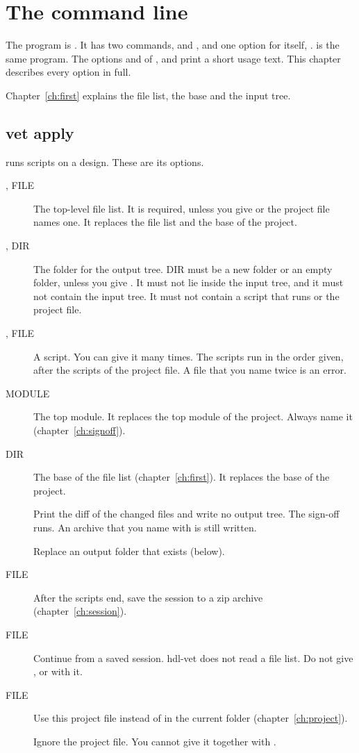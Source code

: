 \chapter{The command line}
\label{ch:cli}

The program is . It has two commands,  and , and
one option for itself, .  is the same program.
The options  and  of ,  and 
print a short usage text. This chapter describes every option in full.

Chapter~\ref{ch:first} explains the file list, the base and the input tree.

\section{vet apply}

 runs scripts on a design. These are its options.

\begin{description}
\item[,  FILE] The top-level file list. It is required,
  unless you give  or the project file names one. It replaces the
  file list and the base of the project.
\item[,  DIR] The folder for the output tree. DIR must be a
  new folder or an empty folder, unless you give . It must not lie inside
  the input tree, and it must not contain the input tree. It must not contain a script
  that runs or the project file.
\item[,  FILE] A script. You can give it many times. The scripts run
  in the order given, after the scripts of the project file. A file that you name twice is
  an error.
\item[ MODULE] The top module. It replaces the top module of the project.
  Always name it (chapter~\ref{ch:signoff}).
\item[ DIR] The base of the file list (chapter~\ref{ch:first}). It replaces
  the base of the project.
\item[] Print the diff of the changed files and write no output tree.
  The sign-off runs. An archive that you name with  is still written.
\item[] Replace an output folder that exists (below).
\item[ FILE] After the scripts end, save the session to a zip archive
  (chapter~\ref{ch:session}).
\item[ FILE] Continue from a saved session. hdl-vet does not read a
  file list. Do not give ,  or  with it.
\item[ FILE] Use this project file instead of  in
  the current folder (chapter~\ref{ch:project}).
\item[] Ignore the project file. You cannot give it together with
  .
\end{description}

